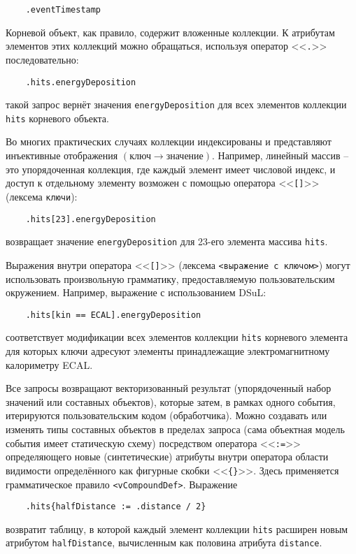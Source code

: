 \begin{verbatim}
    .eventTimestamp
\end{verbatim}

Корневой объект, как правило, содержит вложенные коллекции. К
атрибутам элементов этих коллекций можно обращаться, используя
оператор <<\texttt{.}>> последовательно:
\begin{verbatim}
    .hits.energyDeposition
\end{verbatim}
такой запрос вернёт значения \texttt{energyDeposition} для всех
элементов коллекции \texttt{hits} корневого объекта.

Во многих практических случаях коллекции индексированы и представляют
инъективные отображения $(\text{ключ} \rightarrow \text{значение})$.
Например, линейный массив -- это упорядоченная коллекция,
где каждый элемент имеет числовой индекс, и доступ к отдельному
элементу возможен с помощью оператора <<\texttt{[]}>> (лексема \texttt{ключи}):
\begin{verbatim}
    .hits[23].energyDeposition
\end{verbatim}
возвращает значение \texttt{energyDeposition}
для 23-его элемента массива \texttt{hits}.


Выражения внутри оператора <<\texttt{[]}>> (лексема \texttt{<выражение с ключом>})
могут использовать произвольную грамматику, предоставляемую
пользовательским окружением. Например, выражение с использованием DSuL:
\begin{verbatim}
    .hits[kin == ECAL].energyDeposition
\end{verbatim}
соответствует модификации всех элементов коллекции \texttt{hits}
корневого элемента для которых ключи адресуют элементы принадлежащие
электромагнитному калориметру ECAL.

Все запросы возвращают векторизованный результат (упорядоченный набор
значений или составных объектов), которые затем, в рамках одного события,
итерируются пользовательским кодом (обработчика). Можно создавать или изменять
типы составных объектов в пределах запроса (сама объектная модель события
имеет статическую схему) посредством оператора <<\texttt{:=}>> определяющего
новые (синтетические) атрибуты внутри оператора области видимости
определённого как фигурные скобки <<\texttt{\{\}}>>. Здесь применяется
грамматическое правило \texttt{<vCompoundDef>}. Выражение
\begin{verbatim}
    .hits{halfDistance := .distance / 2}
\end{verbatim}
возвратит таблицу, в которой каждый элемент коллекции \texttt{hits}
расширен новым атрибутом \texttt{halfDistance}, вычисленным как
половина атрибута \texttt{distance}.

